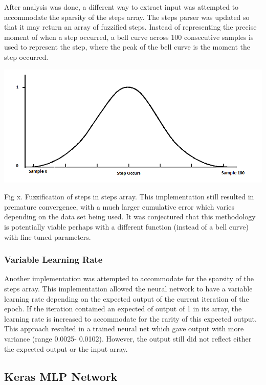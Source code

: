After analysis was done, a different way to extract input was attempted to accommodate the sparsity of the steps array. The steps parser was updated so that it may return an array of fuzzified steps. Instead of representing the precise moment of when a step occurred, a bell curve across 100 consecutive samples is used to represent the step, where the peak of the bell curve is the moment the step occurred.

\includegraphics[scale=0.3]{fuzzy.png}

Fig x. Fuzzification of steps in steps array.
This implementation still resulted in premature convergence, with a much larger cumulative error which varies depending on the data set being used. It was conjectured that this methodology is potentially viable perhaps with a different function (instead of a bell curve) with fine-tuned parameters.\\

\subsubsection{Variable Learning Rate}
Another implementation was attempted to accommodate for the sparsity of the steps array. This implementation allowed the neural network to have a variable learning rate depending on the expected output of the current iteration of the epoch. If the iteration contained an expected of output of 1 in its array, the learning rate is increased to accommodate for the rarity of this expected output. This approach resulted in a trained neural net which gave output with more variance (range 0.0025- 0.0102). However, the output still did not reflect either the expected output or the input array.\\

\subsection{Keras MLP Network}

